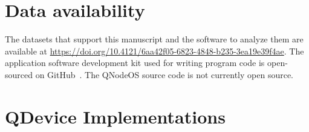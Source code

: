 


\section{Data availability}
The datasets that support this manuscript and the software to analyze them are available at \url{https://doi.org/10.4121/6aa42f05-6823-4848-b235-3ea19e39f4ae}. The application software development kit used for writing program code is open-sourced on GitHub~\cite{netqasm_sdk}. The QNodeOS source code is not currently open source.


\clearpage

\clearpage
\section{QDevice Implementations}


\clearpage

\clearpage


\clearpage

\clearpage

\clearpage


\begin{xstretch}
\printbibliography[heading=subbibintoc,title={References},notcategory=noprint]
\end{xstretch}
